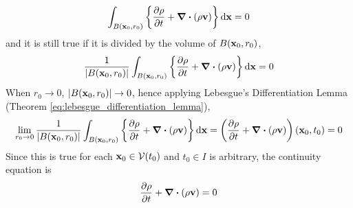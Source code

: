 \begin{equation}
	\int_{B(\vb{x}_0, r_0)} \left\{ \frac{\partial \rho}{\partial t} + \div(\rho \vb{v}) \right\} \dd{\vb{x}} = 0
\end{equation}
and it is still true if it is divided by the volume of $B(\vb{x}_0, r_0)$,
\begin{equation}
	\frac{1}{\abs{B(\vb{x}_0, r_0)}}
	\int_{B(\vb{x}_0, r_0)} \left\{ \frac{\partial \rho}{\partial t} + \div(\rho \vb{v}) \right\} \dd{\vb{x}} = 0
\end{equation}
When $r_0 \to 0$, $\abs{B(\vb{x}_0, r_0)} \to 0$, hence applying Lebesgue's Differentiation Lemma (Theorem \ref{eq:lebesgue_differentiation_lemma}),
\begin{equation}
	\lim_{r_0 \to 0}
	\frac{1}{\abs{B(\vb{x}_0, r_0)}}
	\int_{B(\vb{x}_0, r_0)} \left\{ \frac{\partial \rho}{\partial t} + \div(\rho \vb{v}) \right\} \dd{\vb{x}} = 
	\left( \frac{\partial \rho}{\partial t} + \div(\rho \vb{v}) \right) (\vb{x}_0, t_0) = 0
\end{equation}
Since this is true for each $\vb{x}_0 \in \mathcal{V}(t_0)$ and $t_0 \in I$ is arbitrary, the continuity equation is
\begin{equation}
	\pdv{\rho}{t} + \div(\rho \vb{v}) = 0
\end{equation}

